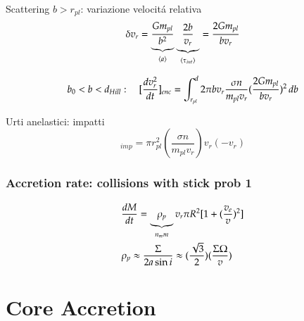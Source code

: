 \documentclass[main.tex]{subfiles}
\begin{document}
{Scattering $b>r_{pl}$: variazione velocit\'a relativa}
\begin{equation*}
\delta v_r=\underbrace{\frac{Gm_{pl}}{b^2}}_{\exv{a}}\underbrace{\frac{2b}{v_r}}_{\exv{\tau_{int}}}=\frac{2Gm_{pl}}{bv_r}
\end{equation*}

\begin{equation*}
b_0<b<d_{Hill}:\quad [\TDy{t}{v_r^2}]_{enc}=\int_{r_{pl}}^d2\pi bv_r\frac{\sigma n}{m_{pl}v_r}(\frac{2Gm_{pl}}{bv_r})^2\,db
\end{equation*}

{Urti anelastici: impatti}
\begin{equation*}
[\TDy{t}{v_r^2}]_{imp}=\pi r_{pl}^2(\frac{\sigma n}{m_{pl}v_r})v_r(-v_r)
\end{equation*}

\subsection{Accretion rate: collisions with stick prob 1}
\begin{align}
&\TDy{t}{M}=\underbrace{\rho_p}_{n_mm}v_r\pi R^2[1+(\frac{v_e}{v})^2]\\
&\rho_p\approx\frac{\Sigma}{2a\sin{i}}\approx(\frac{\sqrt{3}}{2})(\frac{\Sigma\Omega}{v})
\end{align}

\chapter{Core Accretion}
\end{document}
